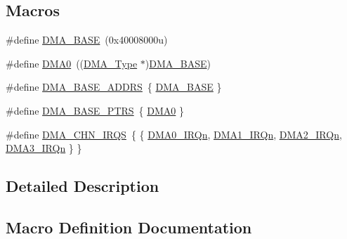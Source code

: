 \subsection*{Macros}
\begin{DoxyCompactItemize}
\item 
\#define \mbox{\hyperlink{group___d_m_a___peripheral___access___layer_gab04dd812f37907dc8bd6ed82e346b563}{D\+M\+A\+\_\+\+B\+A\+SE}}~(0x40008000u)
\item 
\#define \mbox{\hyperlink{group___d_m_a___peripheral___access___layer_ga4103044f9ca209772f513dc694513ffb}{D\+M\+A0}}~((\mbox{\hyperlink{struct_d_m_a___type}{D\+M\+A\+\_\+\+Type}} $\ast$)\mbox{\hyperlink{group___d_m_a___peripheral___access___layer_gab04dd812f37907dc8bd6ed82e346b563}{D\+M\+A\+\_\+\+B\+A\+SE}})
\item 
\#define \mbox{\hyperlink{group___d_m_a___peripheral___access___layer_ga3e24fb8f1e5ce6161c39aa9d8b7c4d16}{D\+M\+A\+\_\+\+B\+A\+S\+E\+\_\+\+A\+D\+D\+RS}}~\{ \mbox{\hyperlink{group___d_m_a___peripheral___access___layer_gab04dd812f37907dc8bd6ed82e346b563}{D\+M\+A\+\_\+\+B\+A\+SE}} \}
\item 
\#define \mbox{\hyperlink{group___d_m_a___peripheral___access___layer_gada914e90165e25ae4eeddf5175920e77}{D\+M\+A\+\_\+\+B\+A\+S\+E\+\_\+\+P\+T\+RS}}~\{ \mbox{\hyperlink{group___d_m_a___peripheral___access___layer_ga4103044f9ca209772f513dc694513ffb}{D\+M\+A0}} \}
\item 
\#define \mbox{\hyperlink{group___d_m_a___peripheral___access___layer_ga6defb6ef05bbbec3e07f8d2610756b7b}{D\+M\+A\+\_\+\+C\+H\+N\+\_\+\+I\+R\+QS}}~\{ \{ \mbox{\hyperlink{group___interrupt__vector__numbers_gga666eb0caeb12ec0e281415592ae89083a54cf3bb3d65007c25a2a97568a355e09}{D\+M\+A0\+\_\+\+I\+R\+Qn}}, \mbox{\hyperlink{group___interrupt__vector__numbers_gga666eb0caeb12ec0e281415592ae89083a57600b87fbb88dd15a08ff990bcf6f28}{D\+M\+A1\+\_\+\+I\+R\+Qn}}, \mbox{\hyperlink{group___interrupt__vector__numbers_gga666eb0caeb12ec0e281415592ae89083a203b0e7d071d7b0e275eec1d73e99d88}{D\+M\+A2\+\_\+\+I\+R\+Qn}}, \mbox{\hyperlink{group___interrupt__vector__numbers_gga666eb0caeb12ec0e281415592ae89083a34ecc6303d93b420da12f2e5c2c8366c}{D\+M\+A3\+\_\+\+I\+R\+Qn}} \} \}
\end{DoxyCompactItemize}


\subsection{Detailed Description}


\subsection{Macro Definition Documentation}
\mbox{\label{group___d_m_a___peripheral___access___layer_ga4103044f9ca209772f513dc694513ffb}} 
